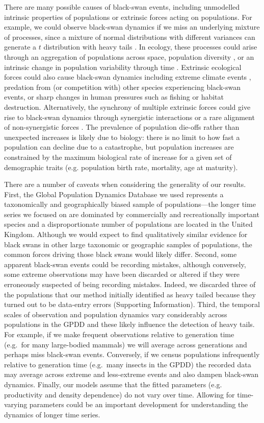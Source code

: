 \documentclass[9pt,twocolumn,twoside]{pnas-new}
\begin{document}
There are many possible causes of black-swan events, including
unmodelled intrinsic properties of populations or extrinsic forces acting on
populations. For example, we could observe black-swan dynamics if we miss an
underlying mixture of processes, since a mixture of normal distributions with
different variances can generate a $t$ distribution with heavy
tails \cite{gelman2014}. In ecology, these processes could arise through an
aggregation of populations across space, population
diversity \cite{schindler2010}, or an intrinsic change in population variability
through time \cite{carpenter2006}. Extrinsic ecological forces could also cause
black-swan dynamics \cite{nunez2012} including extreme climate
events \cite{meehl2004, katz2005, ipcc2012}, predation from (or competition
with) other species experiencing black-swan events, or sharp changes in human
pressures such as fishing or habitat destruction.
Alternatively, the
synchrony of multiple extrinsic forces could give rise to black-swan dynamics
through synergistic interactions \cite{kirby2009} or a rare alignment of
non-synergistic forces \cite{denny2009}.
The prevalence of population die-offs rather than unexpected increases
is likely due to biology:
there is no limit to how fast a population can decline due to a catastrophe,
but population increases are constrained
by the maximum biological rate of increase
for a given set of demographic traits
(e.g. population birth rate, mortality, age at maturity).

There are a number of caveats when considering the generality of our results.
First, the Global Population Dynamics Database \cite[GPDD,][]{gpdd2010} we used
represents a taxonomically and geographically biased sample of
populations---the longer time series we focused on are dominated by commercially
and recreationally important species and a disproportionate number of
populations are located in the United Kingdom. Although we would expect to find
qualitatively similar evidence for black swans in other large taxonomic or
geographic samples of populations, the common forces driving those black swans
would likely differ. Second, some apparent black-swan events could be
recording mistakes, although conversely, some extreme observations may have been
discarded or altered if they were erroneously suspected of being recording
mistakes. Indeed, we discarded three of the populations that our method
initially identified as heavy tailed because they turned out to be data-entry
errors (Supporting Information).
Third, the temporal scales of observation and population dynamics
vary considerably across populations in the GPDD and these likely influence the
detection of heavy tails. For example, if we make frequent observations
relative to generation time (e.g.~for many large-bodied mammals) we will
average across generations and perhaps miss black-swan events. Conversely, if
we census populations infrequently relative to generation time (e.g.~many
insects in the GPDD) the recorded data may average across extreme and
less-extreme events and also dampen black-swan dynamics.
Finally, our models assume that
the fitted parameters (e.g. productivity and density dependence)
do not vary over time.
Allowing for time-varying parameters
could be an important development for
understanding the dynamics of longer time series.
\end{document}
